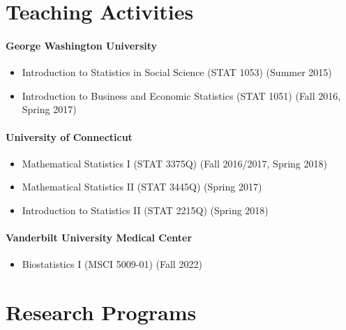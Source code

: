 \documentclass[12pt]{article}
\begin{document}
	
	\section*{Teaching Activities}
	\paragraph{George Washington University}
	\begin{itemize}
		\item Introduction to Statistics in Social Science (STAT 
		1053) (Summer 2015)
		\item Introduction to Business and Economic Statistics 
		(STAT 1051) (Fall 2016, Spring 2017)
	\end{itemize}
	\paragraph{University of Connecticut}
	\begin{itemize}
		\item Mathematical Statistics {\rm I} (STAT 3375Q) (Fall 
		2016/2017, Spring 2018)
		\item Mathematical Statistics {\rm II} (STAT 3445Q) (Spring 
		2017)
		\item Introduction to Statistics {\rm II} (STAT 2215Q) 
		(Spring 2018)
	\end{itemize}
	\paragraph{Vanderbilt University Medical Center}
	\begin{itemize}
		\item Biostatistics {\rm I} (MSCI 5009-01) (Fall 2022)
	\end{itemize}

	
	\section*{Research Programs}
\end{document}
